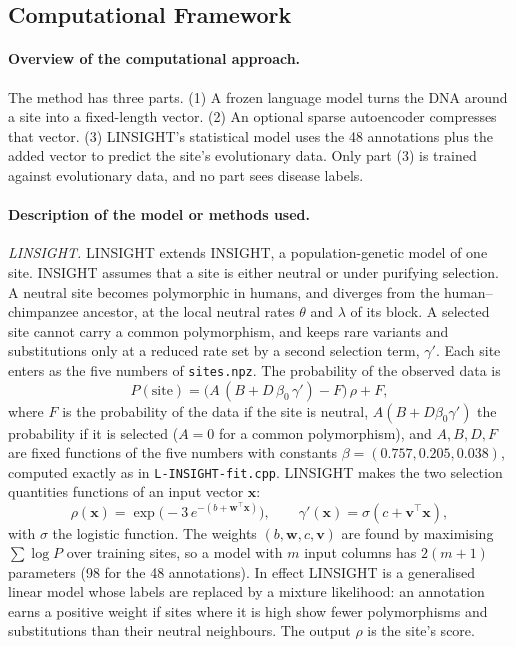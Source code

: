 \documentclass[11pt]{article}
\newcommand{\file}[1]{\nolinkurl{#1}}
\begin{document}
\subsection*{Computational Framework}
\paragraph{Overview of the computational approach.} The method has three parts. (1) A frozen language
model turns the DNA around a site into a fixed-length vector. (2) An optional sparse autoencoder compresses
that vector. (3) LINSIGHT's statistical model uses the 48 annotations plus the added vector to predict the
site's evolutionary data. Only part (3) is trained against evolutionary data, and no part sees disease
labels.

\paragraph{Description of the model or methods used.}
\emph{LINSIGHT.} LINSIGHT extends INSIGHT, a
population-genetic model of one site. INSIGHT assumes that a site is either neutral or under purifying
selection. A neutral site becomes polymorphic in humans, and diverges from the human--chimpanzee ancestor,
at the local neutral rates $\theta$ and $\lambda$ of its block. A selected site cannot carry a common
polymorphism, and keeps rare variants and substitutions only at a reduced rate set by a second selection
term, $\gamma'$. Each site enters as the five numbers of \file{sites.npz}. The probability of the observed
data is
\begin{equation}
P(\text{site}) = \big(A\,(B + D\,\beta_0\,\gamma') - F\big)\,\rho + F ,
\label{eq:lik}
\end{equation}
where $F$ is the probability of the data if the site is neutral, $A(B + D\beta_0\gamma')$ the probability
if it is selected ($A=0$ for a common polymorphism), and $A,B,D,F$ are fixed functions of the five numbers
with constants $\beta=(0.757, 0.205, 0.038)$, computed exactly as in \file{L-INSIGHT-fit.cpp}. LINSIGHT
makes the two selection quantities functions of an input vector $\mathbf{x}$:
\begin{equation}
\rho(\mathbf{x})=\exp\!\big(-3\,e^{-(b+\mathbf{w}^{\top}\mathbf{x})}\big),\qquad
\gamma'(\mathbf{x})=\sigma(c+\mathbf{v}^{\top}\mathbf{x}),
\label{eq:linsight}
\end{equation}
with $\sigma$ the logistic function. The weights $(b,\mathbf{w},c,\mathbf{v})$ are found by maximising
$\sum\log P$ over training sites, so a model with $m$ input columns has $2(m+1)$ parameters (98 for the 48
annotations). In effect LINSIGHT is a generalised linear model whose labels are replaced by a mixture
likelihood: an annotation earns a positive weight if sites where it is high show fewer polymorphisms and
substitutions than their neutral neighbours. The output $\rho$ is the site's score.
\end{document}
